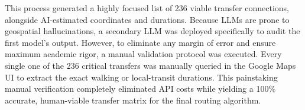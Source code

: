 This process generated a highly focused list of 236 viable transfer connections, alongside AI-estimated coordinates and durations. Because LLMs are prone to geospatial hallucinations, a secondary LLM was deployed specifically to audit the first model's output. However, to eliminate any margin of error and ensure maximum academic rigor, a manual validation protocol was executed. Every single one of the 236 critical transfers was manually queried in the Google Maps UI to extract the exact walking or local-transit durations. This painstaking manual verification completely eliminated API costs while yielding a 100\% accurate, human-viable transfer matrix for the final routing algorithm.

